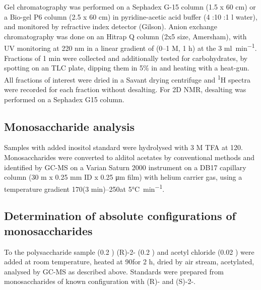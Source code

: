   Gel chromatography was performed on a Sephadex G-15 column (1.5 x 60 \si{\centi\meter}) or a
  Bio-gel P6 column (2.5 x 60 \si{\centi\meter}) in pyridine-acetic acid buffer (4 \millilitre:10
  \millilitre:1 \si{\litre} water), and monitored by refractive index detector (Gilson). Anion
  exchange chromatography was done on an Hitrap Q column (2x5 \millilitre size, Amersham), with
  \ac{UV} monitoring at 220 nm in a linear gradient of  (0--1 M, 1 h) at the 3
  \si{\milli\litre\per\minute}. Fractions of 1 min were collected and additionally tested for
  carbohydrates, by spotting on an  \ac{TLC} plate, dipping them in 5\%  in
   and heating with a heat-gun. All fractions of interest were dried in a Savant drying
  centrifuge and \textsuperscript{1}H spectra were recorded for each fraction without desalting. For
  2D \ac{NMR}, desalting was performed on a Sephadex G15 column.

	\subsection{Monosaccharide analysis} %
	\label{sub:monosaccharide_analysis}

  Samples with added inositol standard were hydrolysed with 3 M \ac{TFA} at 120\cel. Monosaccharides
  were converted to alditol acetates by conventional methods and identified by \ac{GC-MS} on a
  Varian Saturn 2000 instrument on a DB17 capillary column (30 m x 0.25 \si{\milli\meter} ID x 0.25
  \si{\micro\meter} film) with helium carrier gas, using a temperature gradient 170\cel (3
  min)--250\cel at 5\si{\degreeCelsius\per\minute}.

	\subsection{Determination of absolute configurations of monosaccharides} %
	\label{sub:determination_of_absolute_configurations_of_monosaccharides}

  To the polysaccharide sample (0.2 \milligram) (R)-2- (0.2 \millilitre) and acetyl
  chloride (0.02 \millilitre) were added at room temperature, heated at 90\cel for 2 h, dried by air
  stream, acetylated, analysed by \ac{GC-MS} as described above. Standards were prepared from
  monosaccharides of known configuration with (R)- and (S)-2-.

